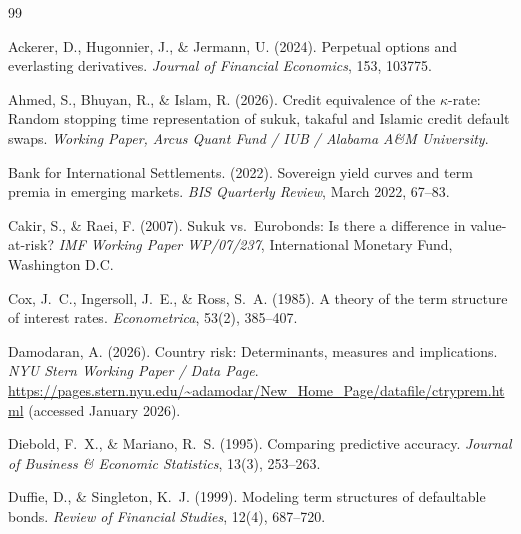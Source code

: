 \documentclass[12pt]{article}
\theoremstyle{plain}
\theoremstyle{definition}
\theoremstyle{remark}
\begin{document}



\begin{thebibliography}{99}

Ackerer, D., Hugonnier, J., \& Jermann, U. (2024).
\newblock Perpetual options and everlasting derivatives.
\newblock \textit{Journal of Financial Economics}, 153, 103775.

Ahmed, S., Bhuyan, R., \& Islam, R. (2026).
\newblock Credit equivalence of the $\kappa$-rate: Random stopping time
  representation of sukuk, takaful and Islamic credit default swaps.
\newblock \textit{Working Paper, Arcus Quant Fund / IUB / Alabama A\&M
  University}.

Bank for International Settlements. (2022).
\newblock Sovereign yield curves and term premia in emerging markets.
\newblock \textit{BIS Quarterly Review}, March 2022, 67--83.

Cakir, S., \& Raei, F. (2007).
\newblock Sukuk vs.\ Eurobonds: Is there a difference in value-at-risk?
\newblock \textit{IMF Working Paper WP/07/237}, International Monetary Fund,
  Washington D.C.

Cox, J.~C., Ingersoll, J.~E., \& Ross, S.~A. (1985).
\newblock A theory of the term structure of interest rates.
\newblock \textit{Econometrica}, 53(2), 385--407.

Damodaran, A. (2026).
\newblock Country risk: Determinants, measures and implications.
\newblock \textit{NYU Stern Working Paper / Data Page}.
  \url{https://pages.stern.nyu.edu/~adamodar/New_Home_Page/datafile/ctryprem.html}
  (accessed January 2026).

Diebold, F.~X., \& Mariano, R.~S. (1995).
\newblock Comparing predictive accuracy.
\newblock \textit{Journal of Business \& Economic Statistics}, 13(3), 253--263.

Duffie, D., \& Singleton, K.~J. (1999).
\newblock Modeling term structures of defaultable bonds.
\newblock \textit{Review of Financial Studies}, 12(4), 687--720.


\end{thebibliography}
\end{document}
